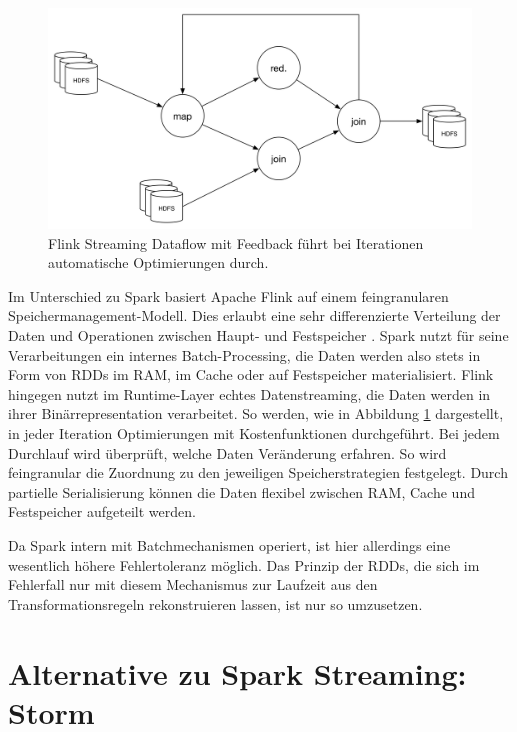 \begin{figure}[htb!]
\centering
\includegraphics[width=1.0\textwidth]{bilder/flink.png}
\caption{Flink Streaming Dataflow mit Feedback führt bei Iterationen automatische Optimierungen durch.}
\label{fig:flink}
\end{figure} 

Im Unterschied zu Spark basiert Apache Flink auf einem feingranularen Speichermanagement-Modell. Dies erlaubt eine sehr differenzierte Verteilung der Daten und Operationen zwischen Haupt- und Festspeicher  . Spark nutzt für seine Verarbeitungen ein internes Batch-Processing, die Daten werden also stets in Form von RDDs im RAM, im Cache oder auf Festspeicher materialisiert. Flink hingegen nutzt im Runtime-Layer echtes Datenstreaming, die Daten werden in ihrer Binärrepresentation verarbeitet. So werden, wie in Abbildung \ref{fig:flink} dargestellt, in jeder Iteration Optimierungen mit Kostenfunktionen durchgeführt. Bei jedem Durchlauf wird überprüft, welche Daten Veränderung erfahren. So wird feingranular die Zuordnung zu den jeweiligen Speicherstrategien festgelegt. Durch partielle Serialisierung können die Daten flexibel zwischen RAM, Cache und Festspeicher aufgeteilt werden.

Da Spark intern mit Batchmechanismen operiert, ist hier allerdings eine wesentlich höhere Fehlertoleranz möglich. Das Prinzip der RDDs, die sich im Fehlerfall nur mit diesem Mechanismus zur Laufzeit aus den Transformationsregeln rekonstruieren lassen, ist nur so umzusetzen. 


 



\section{Alternative zu Spark Streaming: Storm}
\label{section:storm}


